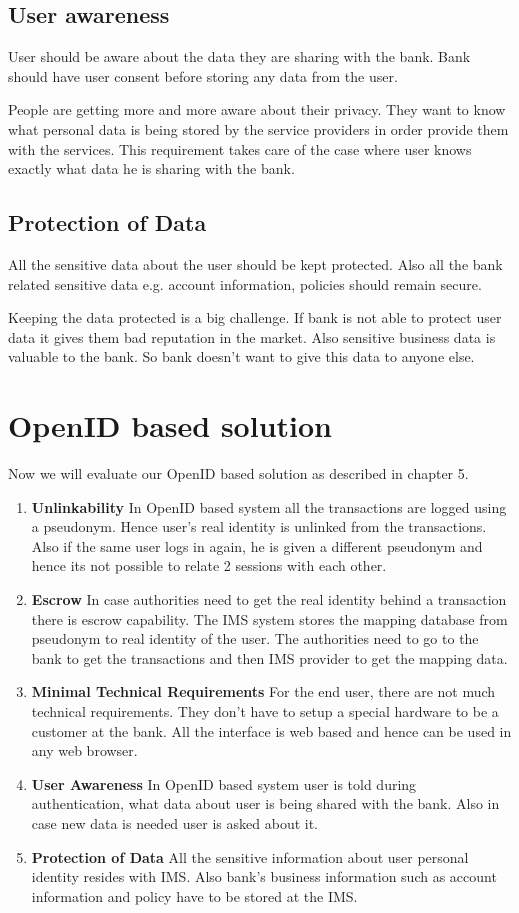 \subsection{User awareness}
User should be aware about the data they are sharing with the bank. Bank should have user consent before storing any data from the user.

People are getting more and more aware about their privacy. They want to know what personal data is being stored by the service providers in order provide them with the services. This requirement takes care of the case where user knows exactly what data he is sharing with the bank.
\subsection{Protection of Data}
All the sensitive data about the user should be kept protected. Also all the bank related sensitive data e.g. account information, policies should remain secure.

Keeping the data protected is a big challenge. If bank is not able to protect user data it gives them bad reputation in the market. Also sensitive business data is valuable to the bank. So bank doesn't want to give this data to anyone else.

\section{OpenID based solution}
Now we will evaluate our OpenID based solution as described in chapter 5. 
\begin{enumerate}
	\item{\textbf{Unlinkability}}
	In OpenID based system all the transactions are logged using a pseudonym. Hence user's real identity is unlinked from the transactions. Also if the same user logs in again, he is given a different pseudonym and hence its not possible to relate 2 sessions with each other.
	\item{\textbf{Escrow}}
	In case authorities need to get the real identity behind a transaction there is escrow capability. The IMS system stores the mapping database from pseudonym to real identity of the user. The authorities need to go to the bank to get the transactions and then IMS provider to get the mapping data.
	\item{\textbf{Minimal Technical Requirements}}
	For the end user, there are not much technical requirements. They don't have to setup a special hardware to be a customer at the bank. All the interface is web based and hence can be used in any web browser. 
	\item{\textbf{User Awareness}}
	In OpenID based system user is told during authentication, what data about user is being shared with the bank. Also in case new data is needed user is asked about it.
	\item{\textbf{Protection of Data}}
	All the sensitive information about user personal identity resides with IMS. Also bank's business information such as account information and policy have to be stored at the IMS.
\end{enumerate}
